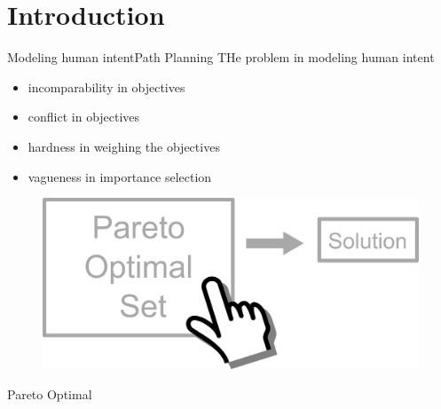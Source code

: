 \section{Introduction}

\begin{frame}{Modeling human intent}{Path Planning}
THe problem in modeling human intent
\begin{itemize}
\item incomparability in objectives
\item conflict in objectives
\item hardness in weighing the objectives
\item vagueness in importance selection
\end{itemize}
\begin{figure}
\centering
\includegraphics[width=0.6\linewidth]{figure/human_interactive_moo}
\label{fig:human_interactive_moo}
\end{figure}
\end{frame}

\begin{frame}{Pareto Optimal}{}
\end{frame}